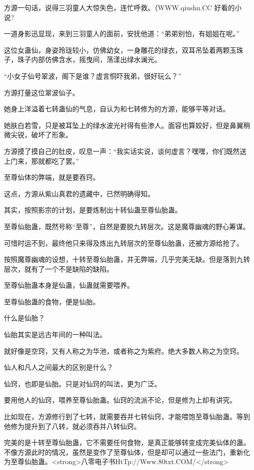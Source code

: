
\begin{this_body}

方源一句话，说得三羽童人大惊失色，连忙呼救。（WWW.qiushu.CC 好看的小说?

一道身影迅显现，来到三羽童人的面前，安抚他道：“弟弟别怕，有姐姐在呢。”

这位女蛊仙，身姿玲珑较小，仿佛幼女，一身雕花的绿衣，双耳吊坠着两颗玉珠子，珠子内部仿佛含水，摇曳间，荡漾出绿水澜光。

“小女子仙号翠波，阁下是谁？虚言恫吓我弟，很好玩么？”

方源打量这位翠波仙子。

她身上洋溢着七转蛊仙的气息，自认为和七转修为的方源，能够平等对话。

她肤白若雪，只是被耳坠上的绿水波光衬得有些渗人。面容也算姣好，但是鼻翼稍微尖锐，破坏了形象。

方源摸了摸自己的肚皮，叹息一声：“我实话实说，谈何虚言？嘿嘿，你们既然送上门来，那就都吃了罢。”

至尊仙体的弊端，就是要吞窍。

这点，方源从紫山真君的遗藏中，已然明确得知。

其实，按照影宗的计划，是要炼制出十转仙蛊至尊仙胎蛊。

至尊仙胎蛊，既然号称“至尊”，自然是要脱九转层次。这是魔尊幽魂的野心筹谋。

可惜时运不到，最终他只来得及炼出九转层次的至尊仙胎蛊，还被方源给抢了。

按照魔尊幽魂的设想，十转至尊仙胎蛊，并无弊端，几乎完美无缺。但是落到九转层次，就有了一个不是缺陷的缺陷。

至尊仙胎蛊本身是仙蛊，仙蛊就需要喂养。

至尊仙胎蛊的食物，便是仙胎。

什么是仙胎？

仙胎其实是远古年间的一种叫法。

就好像是空窍，又有人称之为华池，或者称之为紫府。绝大多数人称之为空窍。

仙人和凡人之间最大的区别是什么？

仙窍，也即是仙胎。只是对仙窍的叫法，更为广泛。

要用他人的仙窍，喂养至尊仙胎蛊。仙窍的流派不论，但是修为上却有讲究。

比如现在，方源修行到了七转，就需要吞并七转仙窍，才能喂饱至尊仙胎蛊。等到他修为提升到了八转，就必须吞并八转仙窍。

完美的是十转至尊仙胎蛊，它不需要任何食物，是真正能够转变成完美仙体的蛊。不像方源此时的情况，虽然是变作了至尊仙体，但是却可以通过一些法门，重新化为至尊仙胎蛊。<strong>八零电子书HtTp://Www.80txt.COM/</strong>


\end{this_body}
